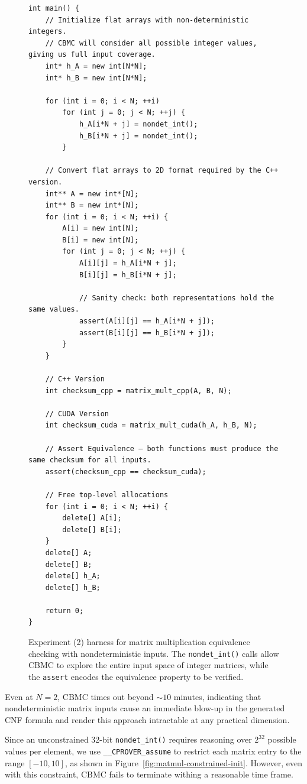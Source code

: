 \documentclass{article}
\begin{document}
\begin{figure}[H]
\begin{verbatim}
int main() {
    // Initialize flat arrays with non-deterministic integers.
    // CBMC will consider all possible integer values, giving us full input coverage.
    int* h_A = new int[N*N];
    int* h_B = new int[N*N];

    for (int i = 0; i < N; ++i)
        for (int j = 0; j < N; ++j) {
            h_A[i*N + j] = nondet_int();
            h_B[i*N + j] = nondet_int();
        }

    // Convert flat arrays to 2D format required by the C++ version.
    int** A = new int*[N];
    int** B = new int*[N];
    for (int i = 0; i < N; ++i) {
        A[i] = new int[N];
        B[i] = new int[N];
        for (int j = 0; j < N; ++j) {
            A[i][j] = h_A[i*N + j];
            B[i][j] = h_B[i*N + j];

            // Sanity check: both representations hold the same values.
            assert(A[i][j] == h_A[i*N + j]);
            assert(B[i][j] == h_B[i*N + j]);
        }
    }

    // C++ Version
    int checksum_cpp = matrix_mult_cpp(A, B, N);

    // CUDA Version
    int checksum_cuda = matrix_mult_cuda(h_A, h_B, N);

    // Assert Equivalence — both functions must produce the same checksum for all inputs.
    assert(checksum_cpp == checksum_cuda);

    // Free top-level allocations
    for (int i = 0; i < N; ++i) {
        delete[] A[i];
        delete[] B[i];
    }
    delete[] A;
    delete[] B;
    delete[] h_A;
    delete[] h_B;

    return 0;
}
\end{verbatim}
\caption{Experiment (2) harness for matrix multiplication equivalence checking with nondeterministic inputs. The \texttt{nondet\_int()} calls allow CBMC to explore the entire input space of integer matrices, while the \texttt{assert} encodes the equivalence property to be verified.}
\label{fig:matmul-cbmc-nondet}
\end{figure}

Even at $N = 2$, CBMC times out beyond ${\sim}10$ minutes, indicating that nondeterministic matrix inputs cause an immediate blow-up in the generated CNF formula and render this approach intractable at any practical dimension.

Since an unconstrained 32-bit \texttt{nondet\_int()} requires reasoning over $2^{32}$ possible values per element, we use \texttt{\_\_CPROVER\_assume} to restrict each matrix entry to the range $[-10, 10]$, as shown in Figure~\ref{fig:matmul-constrained-init}. However, even with this constraint, CBMC fails to terminate withing a reasonable time frame.
\end{document}
